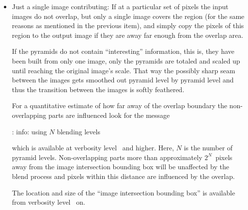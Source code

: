 \begin{itemize}
\item
  Just a single image contributing: If at a particular set of pixels the input images do not
  overlap, but only a single image covers the region (for the same reasons as mentioned in the
  previous item), \App{} and \OtherApp{} simply copy the pixels of this region to the output
  image if they are away far enough from the overlap area.

  \begin{geeknote}
    If the  pyramids do not contain ``interesting'' information, this is,
    they have been built from only one image, only the  pyramids are
    totaled and scaled up until reaching the original image's scale.  That way the possibly
    sharp seam between the images gets smoothed out pyramid level by pyramid level and thus the
    transition between the images is softly feathered.

    For a quantitative estimate of how far away of the overlap boundary the non-overlapping
    parts are influenced look for the message

    \begin{literal}
      \app: info: using $N$ blending levels
    \end{literal}

    which is available at verbosity level~ and higher.  Here,
    $N$ is the number of pyramid levels.  Non-overlapping parts more than approximately
    $2^N$~pixels away from the image intersection bounding box will be unaffected by the blend
    process and pixels within this distance are influenced by the overlap.

    The location and size of the ``image intersection bounding box'' is available from verbosity
    level~ on.
  \end{geeknote}
\end{itemize}



